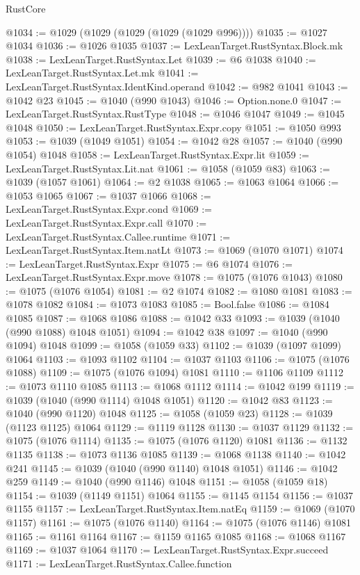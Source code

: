 \begin{lexlean}{RustCore}
\begin{coremodule}
@1034 := @1029 (@1029 (@1029 (@1029 (@1029 @996))))
@1035 := @1027 @1034
@1036 := @1026 @1035
@1037 := LexLeanTarget.RustSyntax.Block.mk
@1038 := LexLeanTarget.RustSyntax.Let
@1039 := @6 @1038
@1040 := LexLeanTarget.RustSyntax.Let.mk
@1041 := LexLeanTarget.RustSyntax.IdentKind.operand
@1042 := @982 @1041
@1043 := @1042 @23
@1045 := @1040 (@990 @1043)
@1046 := Option.none.{0}
@1047 := LexLeanTarget.RustSyntax.RustType
@1048 := @1046 @1047
@1049 := @1045 @1048
@1050 := LexLeanTarget.RustSyntax.Expr.copy
@1051 := @1050 @993
@1053 := @1039 (@1049 @1051)
@1054 := @1042 @28
@1057 := @1040 (@990 @1054) @1048
@1058 := LexLeanTarget.RustSyntax.Expr.lit
@1059 := LexLeanTarget.RustSyntax.Lit.nat
@1061 := @1058 (@1059 @83)
@1063 := @1039 (@1057 @1061)
@1064 := @2 @1038
@1065 := @1063 @1064
@1066 := @1053 @1065
@1067 := @1037 @1066
@1068 := LexLeanTarget.RustSyntax.Expr.cond
@1069 := LexLeanTarget.RustSyntax.Expr.call
@1070 := LexLeanTarget.RustSyntax.Callee.runtime
@1071 := LexLeanTarget.RustSyntax.Item.natLt
@1073 := @1069 (@1070 @1071)
@1074 := LexLeanTarget.RustSyntax.Expr
@1075 := @6 @1074
@1076 := LexLeanTarget.RustSyntax.Expr.move
@1078 := @1075 (@1076 @1043)
@1080 := @1075 (@1076 @1054)
@1081 := @2 @1074
@1082 := @1080 @1081
@1083 := @1078 @1082
@1084 := @1073 @1083
@1085 := Bool.false
@1086 := @1084 @1085
@1087 := @1068 @1086
@1088 := @1042 @33
@1093 := @1039 (@1040 (@990 @1088) @1048 @1051)
@1094 := @1042 @38
@1097 := @1040 (@990 @1094) @1048
@1099 := @1058 (@1059 @33)
@1102 := @1039 (@1097 @1099) @1064
@1103 := @1093 @1102
@1104 := @1037 @1103
@1106 := @1075 (@1076 @1088)
@1109 := @1075 (@1076 @1094) @1081
@1110 := @1106 @1109
@1112 := @1073 @1110 @1085
@1113 := @1068 @1112
@1114 := @1042 @199
@1119 := @1039 (@1040 (@990 @1114) @1048 @1051)
@1120 := @1042 @83
@1123 := @1040 (@990 @1120) @1048
@1125 := @1058 (@1059 @23)
@1128 := @1039 (@1123 @1125) @1064
@1129 := @1119 @1128
@1130 := @1037 @1129
@1132 := @1075 (@1076 @1114)
@1135 := @1075 (@1076 @1120) @1081
@1136 := @1132 @1135
@1138 := @1073 @1136 @1085
@1139 := @1068 @1138
@1140 := @1042 @241
@1145 := @1039 (@1040 (@990 @1140) @1048 @1051)
@1146 := @1042 @259
@1149 := @1040 (@990 @1146) @1048
@1151 := @1058 (@1059 @18)
@1154 := @1039 (@1149 @1151) @1064
@1155 := @1145 @1154
@1156 := @1037 @1155
@1157 := LexLeanTarget.RustSyntax.Item.natEq
@1159 := @1069 (@1070 @1157)
@1161 := @1075 (@1076 @1140)
@1164 := @1075 (@1076 @1146) @1081
@1165 := @1161 @1164
@1167 := @1159 @1165 @1085
@1168 := @1068 @1167
@1169 := @1037 @1064
@1170 := LexLeanTarget.RustSyntax.Expr.succeed
@1171 := LexLeanTarget.RustSyntax.Callee.function

\end{coremodule}
\end{lexlean}

